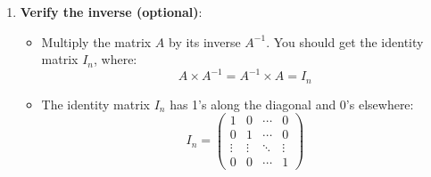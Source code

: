 \begin{process}
\begin{enumerate}
        \item \textbf{Verify the inverse (optional)}:
        \begin{itemize}
            \item Multiply the matrix \( A \) by its inverse \( A^{-1} \). You should get the identity matrix \( I_n \), where:
            \[
            A \times A^{-1} = A^{-1} \times A = I_n
            \]
            \item The identity matrix \( I_n \) has 1's along the diagonal and 0's elsewhere:
            \[
            I_n = \begin{pmatrix}
            1 & 0 & \cdots & 0 \\
            0 & 1 & \cdots & 0 \\
            \vdots & \vdots & \ddots & \vdots \\
            0 & 0 & \cdots & 1
            \end{pmatrix}
            \]
        \end{itemize}
        
    \end{enumerate}
\end{process}